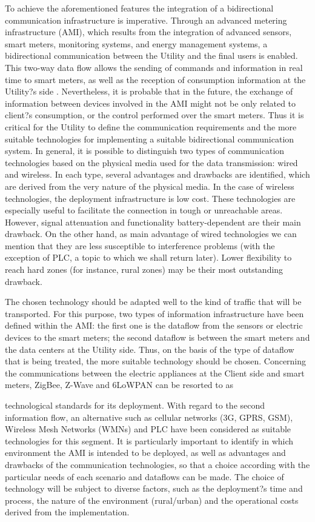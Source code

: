 \documentclass[11pt,final,onecolumn]{IEEEtran}
\begin{document}
To achieve the aforementioned features the integration of a bidirectional communication infrastructure is imperative. Through an advanced metering infrastructure (AMI), which results from the integration of advanced sensors, smart meters, monitoring systems, and energy management systems, a bidirectional communication between the Utility and the final users is enabled. This two-way data flow allows the sending of commands and information in real time to smart meters, as well as the reception of consumption information at the Utility?s side  \cite{Deconinck2008}. Nevertheless, it is probable that in the future, the exchange of information between devices involved in the AMI might not be only related to client?s consumption, or the control performed over the smart meters. Thus it is critical for the Utility to define the communication requirements and the more suitable technologies for implementing a suitable bidirectional communication system. In general, it is possible to distinguish two types of communication technologies based on the physical media used for the data transmission: wired and wireless. In each type, several advantages and drawbacks are identified, which are derived from the very nature of the physical media. In the case of wireless technologies, the deployment infrastructure is low cost. These technologies are especially useful to facilitate the connection in tough or unreachable areas. However, signal attenuation and functionality battery-dependent are their main drawback. On the other hand, as main advantage of wired technologies we can mention that they are less susceptible to interference problems (with the exception of PLC, a topic to which we shall return later). Lower flexibility to reach hard zones (for instance, rural zones) may be their most outstanding drawback.

The chosen technology should be adapted well to the kind of traffic that will be transported. For this purpose, two types of information infrastructure have been defined within the AMI: the first one is the dataflow from the sensors or electric devices to the smart meters; the second dataflow is between the smart meters and the data centers at the Utility side. Thus, on the basis of the type of dataflow that is being treated, the more suitable technology should be chosen. Concerning the communications between the electric appliances at the Client side and smart meters, ZigBee, Z-Wave and 6LoWPAN can be resorted to as 

technological standards for its deployment. With regard to the second information flow, an alternative such as cellular networks (3G, GPRS, GSM), Wireless Mesh Networks (WMNs) and PLC have been considered as suitable technologies for this segment. 
It is particularly important to identify in which environment the AMI is intended to be deployed, as well as advantages and drawbacks of the communication technologies, so that a choice according with the particular needs of each scenario and dataflows can be made. The choice of technology will be subject to diverse factors, such as the deployment?s time and process, the nature of the environment (rural/urban) and the operational costs derived from the implementation.
\end{document}
